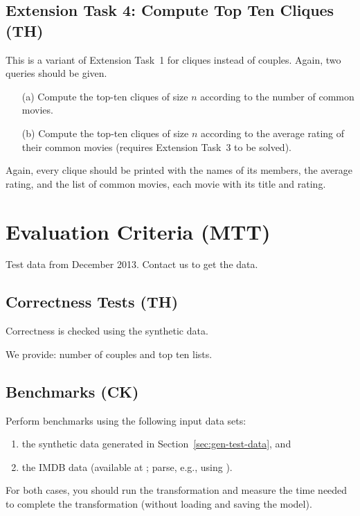 \documentclass[a4paper,11pt]{article}
\begin{document}
\subsection{Extension Task 4: Compute Top Ten Cliques (TH)}

This is a variant of Extension Task~1 for cliques instead of couples.  Again,
two queries should be given.

\begin{enumerate}
\item[(a)] Compute the top-ten cliques of size \(n\) according to the number of
  common movies.
\item[(b)] Compute the top-ten cliques of size \(n\) according to the average
  rating of their common movies (requires Extension Task~3 to be solved).
\end{enumerate}

Again, every clique should be printed with the names of its members, the
average rating, and the list of common movies, each movie with its title and
rating.


\section{Evaluation Criteria (MTT)}\label{sec-eval}

Test data from December 2013. Contact us to get the data.

\subsection{Correctness Tests (TH)}

Correctness is checked using the synthetic data.

We provide: number of couples and top ten lists.

\subsection{Benchmarks (CK)}

Perform benchmarks using the following input data sets:
\begin{enumerate}
\item the synthetic data generated in Section~\ref{sec:gen-test-data}, and 
\item the IMDB data (available at \cite{IMDBDATA}; parse, e.g., using \cite{IMDB2EMF}).
\end{enumerate}
For both cases, you should run the transformation and measure 
the time needed to complete the transformation (without loading 
and saving the model).
\end{document}
